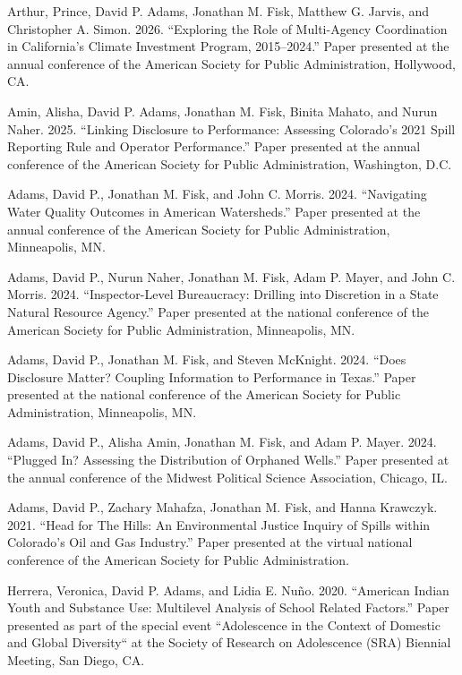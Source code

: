 \documentclass[11pt,letterpaper]{article}
\renewenvironment{itemize}{
  \begin{list}{}{
    \setlength{\leftmargin}{1.5em}
    \setlength{\itemsep}{0.25em}
    \setlength{\parskip}{0pt}
    \setlength{\parsep}{0.25em}
  }
}{
  \end{list}
}
\begin{document}
\begin{itemize}
    \item Arthur, Prince, David P. Adams, Jonathan M. Fisk, Matthew G. Jarvis, and Christopher A. Simon. 2026. ``Exploring the Role of Multi-Agency Coordination in California's Climate Investment Program, 2015--2024.'' Paper presented at the annual conference of the American Society for Public Administration, Hollywood, CA.

    \item Amin, Alisha, David P. Adams, Jonathan M. Fisk, Binita Mahato, and Nurun Naher. 2025. ``Linking Disclosure to Performance: Assessing Colorado's 2021 Spill Reporting Rule and Operator Performance.'' Paper presented at the annual conference of the American Society for Public Administration, Washington, D.C.

    \item Adams, David P., Jonathan M. Fisk, and John C. Morris. 2024. ``Navigating Water Quality Outcomes in American Watersheds.'' Paper presented at the annual conference of the American Society for Public Administration, Minneapolis, MN.
    
    \item Adams, David P., Nurun Naher, Jonathan M. Fisk, Adam P. Mayer, and John C. Morris. 2024. ``Inspector-Level Bureaucracy: Drilling into Discretion in a State Natural Resource Agency.'' Paper presented at the national conference of the American Society for Public Administration, Minneapolis, MN.
    
    \item Adams, David P., Jonathan M. Fisk, and Steven McKnight. 2024. ``Does Disclosure Matter? Coupling Information to Performance in Texas.'' Paper presented at the national conference of the American Society for Public Administration, Minneapolis, MN.
    
    \item Adams, David P., Alisha Amin, Jonathan M. Fisk, and Adam P. Mayer. 2024. ``Plugged In? Assessing the Distribution of Orphaned Wells.'' Paper presented at the annual conference of the Midwest Political Science Association, Chicago, IL.

    \item Adams, David P., Zachary Mahafza, Jonathan M. Fisk, and Hanna Krawczyk. 2021. ``Head for The Hills: An Environmental Justice Inquiry of Spills within Colorado's Oil and Gas Industry.'' Paper presented at the virtual national conference of the American Society for Public Administration.

    \item Herrera, Veronica, David P. Adams, and Lidia E. Nuño. 2020. ``American Indian Youth and Substance Use: Multilevel Analysis of School Related Factors.'' Paper presented as part of the special event ``Adolescence in the Context of Domestic and Global Diversity`` at the Society of Research on Adolescence (SRA) Biennial Meeting, San Diego, CA.
    

\end{itemize}
\end{document}
